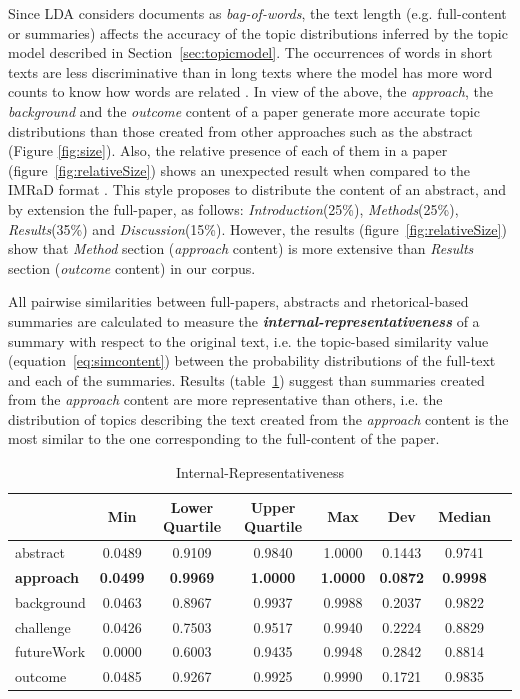 Since LDA considers documents as \textit{bag-of-words}, the text length (e.g. full-content or summaries) affects the accuracy of the topic distributions inferred by the topic model described in Section~\ref{sec:topicmodel}. The occurrences of words in short texts are less discriminative than in long texts where the model has more word counts to know how words are related \citep{Hong2010}. In view of the above, the \textit{approach}, the \textit{background} and the \textit{outcome} content of a paper generate more accurate topic distributions than those created from other approaches such as the abstract (Figure \ref{fig:size}). Also, the relative presence of each of them in a paper (figure~\ref{fig:relativeSize}) shows an unexpected result when compared to the IMRaD format \citep{Nair2014}. This style proposes to distribute the content of an abstract, and by extension the full-paper, as follows: \textit{Introduction}(25\%), \textit{Methods}(25\%), \textit{Results}(35\%) and \textit{Discussion}(15\%). However, the results (figure~\ref{fig:relativeSize}) show that \textit{Method} section (\textit{approach} content) is more extensive than \textit{Results} section (\textit{outcome} content) in our corpus.

All pairwise similarities between full-papers, abstracts and rhetorical-based summaries are calculated to measure the \textbf{\textit{internal-representativeness}} of a summary with respect to the original text, i.e. the topic-based similarity value (equation~\ref{eq:simcontent}) between the probability distributions of the full-text and each of the summaries. Results (table~\ref{tab:irepresentativeness}) suggest than summaries created from the \textit{approach} content are more representative than others, i.e. the distribution of topics describing the text created from the \textit{approach} content is the most similar to the one corresponding to the full-content of the paper.

\begin{table}[!htb]
    \centering
        \begin{tabular}{l*{6}{c}r}\hline
                        & Min & Lower Quartile & Upper Quartile & Max & Dev  & Median \\
          \hline
          abstract & 0.0489 & 0.9109 & 0.9840 & 1.0000 & 0.1443 & 0.9741 \\
          \textbf{approach} & \textbf{0.0499} & \textbf{0.9969} & \textbf{1.0000} & \textbf{1.0000} & \textbf{0.0872} & \textbf{0.9998} \\
          background & 0.0463 & 0.8967 & 0.9937 & 0.9988 & 0.2037 & 0.9822 \\
          challenge & 0.0426 & 0.7503 & 0.9517 & 0.9940 & 0.2224 & 0.8829 \\
          futureWork & 0.0000 & 0.6003 & 0.9435 & 0.9948 & 0.2842 & 0.8814 \\
          outcome & 0.0485 & 0.9267 & 0.9925 & 0.9990 & 0.1721 & 0.9835 \\
        \end{tabular}
    \caption{Internal-Representativeness}\label{tab:irepresentativeness}
\end{table}

